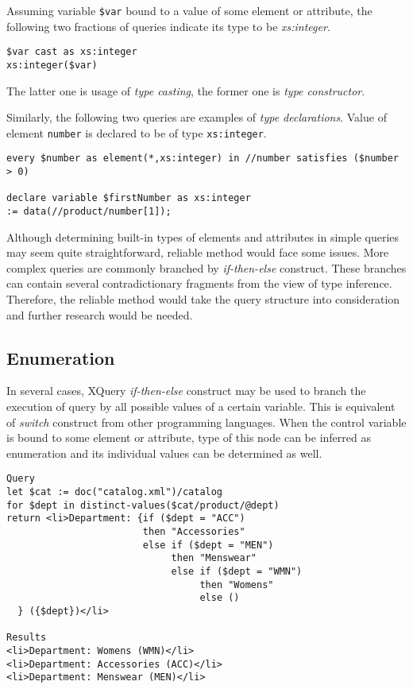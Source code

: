 Assuming variable \texttt{\$var} bound to a value of some element or attribute, the following two fractions of queries indicate its type to be \emph{xs:integer}.

\begin{verbatim}
$var cast as xs:integer
xs:integer($var)
\end{verbatim}

The latter one is usage of \emph{type casting}, the former one is \emph{type constructor}.

Similarly, the following two queries are examples of \emph{type declarations}. Value of element \texttt{number} is declared to be of type \texttt{xs:integer}.

\begin{verbatim}
every $number as element(*,xs:integer) in //number satisfies ($number > 0) 

declare variable $firstNumber as xs:integer 
:= data(//product/number[1]); 
\end{verbatim}

Although determining built-in types of elements and attributes in simple queries may seem quite straightforward, reliable method would face some issues. More complex queries are commonly branched by \emph{if-then-else} construct. These branches can contain several contradictionary fragments from the view of type inference. Therefore, the reliable method would take the query structure into consideration and further research would be needed.

\subsection{Enumeration}
In several cases, XQuery \emph{if-then-else} construct may be used to branch the execution of query by all possible values of a certain variable. This is equivalent of \emph{switch} construct from other programming languages. When the control variable is bound to some element or attribute, type of this node can be inferred as enumeration and its individual values can be determined as well.

\begin{verbatim}
Query
let $cat := doc("catalog.xml")/catalog 
for $dept in distinct-values($cat/product/@dept) 
return <li>Department: {if ($dept = "ACC") 
                        then "Accessories" 
                        else if ($dept = "MEN") 
                             then "Menswear" 
                             else if ($dept = "WMN") 
                                  then "Womens" 
                                  else () 
  } ({$dept})</li> 

Results 
<li>Department: Womens (WMN)</li> 
<li>Department: Accessories (ACC)</li> 
<li>Department: Menswear (MEN)</li> 
\end{verbatim}

